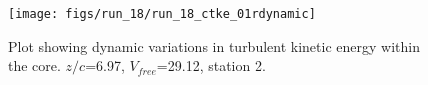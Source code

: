 \begin{figure}[H]
\centering
\texttt{[image: figs/run\_18/run\_18\_ctke\_01rdynamic]}
\caption{Plot showing dynamic variations in turbulent kinetic energy within the core. $z/c$=6.97, $V_{free}$=29.12, station 2.}
\label{fig:run_18_ctke_01rdynamic}
\end{figure}


